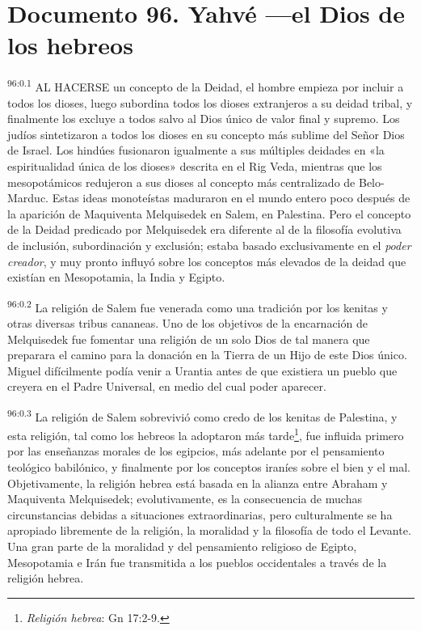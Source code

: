 \chapter{Documento 96. Yahvé ---el Dios de los hebreos}
\par
\textsuperscript{96:0.1} AL HACERSE un concepto de la Deidad, el hombre empieza por incluir a todos los dioses, luego subordina todos los dioses extranjeros a su deidad tribal, y finalmente los excluye a todos salvo al Dios único de valor final y supremo. Los judíos sintetizaron a todos los dioses en su concepto más sublime del Señor Dios de Israel. Los hindúes fusionaron igualmente a sus múltiples deidades en «la espiritualidad única de los dioses» descrita en el Rig Veda, mientras que los mesopotámicos redujeron a sus dioses al concepto más centralizado de Belo-Marduc. Estas ideas monoteístas maduraron en el mundo entero poco después de la aparición de Maquiventa Melquisedek en Salem, en Palestina. Pero el concepto de la Deidad predicado por Melquisedek era diferente al de la filosofía evolutiva de inclusión, subordinación y exclusión; estaba basado exclusivamente en el \textit{poder creador}, y muy pronto influyó sobre los conceptos más elevados de la deidad que existían en Mesopotamia, la India y Egipto.

\par
\textsuperscript{96:0.2} La religión de Salem fue venerada como una tradición por los kenitas y otras diversas tribus cananeas. Uno de los objetivos de la encarnación de Melquisedek fue fomentar una religión de un solo Dios de tal manera que preparara el camino para la donación en la Tierra de un Hijo de este Dios único. Miguel difícilmente podía venir a Urantia antes de que existiera un pueblo que creyera en el Padre Universal, en medio del cual poder aparecer.

\par
\textsuperscript{96:0.3} La religión de Salem sobrevivió como credo de los kenitas de Palestina, y esta religión, tal como los hebreos la adoptaron más tarde\footnote{\textit{Religión hebrea}: Gn 17:2-9.}, fue influida primero por las enseñanzas morales de los egipcios, más adelante por el pensamiento teológico babilónico, y finalmente por los conceptos iraníes sobre el bien y el mal. Objetivamente, la religión hebrea está basada en la alianza entre Abraham y Maquiventa Melquisedek; evolutivamente, es la consecuencia de muchas circunstancias debidas a situaciones extraordinarias, pero culturalmente se ha apropiado libremente de la religión, la moralidad y la filosofía de todo el Levante. Una gran parte de la moralidad y del pensamiento religioso de Egipto, Mesopotamia e Irán fue transmitida a los pueblos occidentales a través de la religión hebrea.


